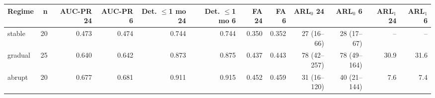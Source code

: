 \documentclass[10pt,a4paper]{article}
\begin{document}
\noindent\begin{minipage}{\linewidth}
\label{tab:S10b}
\centering\scriptsize
\begin{tabular}{lrrrrrrrrrrr}
\toprule
Regime & n & AUC-PR 24 & AUC-PR 6 & Det. $\le$1 mo 24 & Det. $\le$1 mo 6 & FA 24 & FA 6 & ARL$_0$ 24 & ARL$_0$ 6 & ARL$_1$ 24 & ARL$_1$ 6 \\ \midrule
stable & 20 & 0.473 & 0.474 & 0.744 & 0.744 & 0.350 & 0.352 & 27 (16–66) & 28 (17–67) & – & – \\
gradual & 25 & 0.640 & 0.642 & 0.873 & 0.875 & 0.437 & 0.443 & 78 (42–257) & 78 (49–164) & 30.9 & 31.6 \\
abrupt & 20 & 0.677 & 0.681 & 0.911 & 0.915 & 0.452 & 0.459 & 31 (16–120) & 40 (21–144) & 7.6 & 7.4 \\
\bottomrule
\end{tabular}
\end{minipage}
\vspace{22pt}
\end{document}
